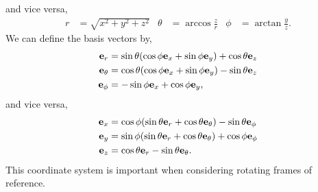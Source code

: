 \documentclass{book}
\begin{document}
and vice versa,
\begin{align}
    r &= \sqrt{x^2 + y^2 + z^2} & \theta&=\arccos{\frac{z}{r}} & \phi&=\arctan{\frac{y}{z}}.
\end{align}
We can define the basis vectors by,
\begin{align}
    \vb{e}_r &= \sin\theta(\cos\phi\vb{e}_x + \sin\phi\vb{e}_y) + \cos\theta\vb{e}_z \\
    \vb{e}_{\theta} & = \cos\theta(\cos\phi\vb{e}_x + \sin\phi\vb{e}_y) - \sin\theta\vb{e}_z \\
    \vb{e}_{\phi} &= -\sin\phi\vb{e}_x + \cos\phi\vb{e}_y,
\end{align}
and vice versa,
\begin{align}
    \vb{e}_x &= \cos\phi(\sin\theta\vb{e}_r + \cos\theta\vb{e}_{\theta}) - \sin\theta\vb{e}_{\phi} \\
    \vb{e}_{y} & = \sin\phi(\sin\theta\vb{e}_r + \cos\theta\vb{e}_{\theta}) + \cos\phi\vb{e}_{\phi} \\
    \vb{e}_{z} &=  \cos\theta\vb{e}_r -\sin\theta\vb{e}_{\theta}.
\end{align}
This coordinate system is important when considering rotating frames of reference.
\end{document}

